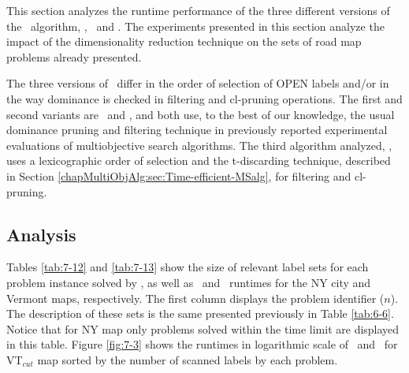 This section analyzes the runtime performance of the three different versions of the \namoa \ algorithm, \namoalex, \namoalin \ and \namoate. The experiments presented in this section analyze the impact of the dimensionality reduction technique on the sets of road map problems already presented.

The three versions of \namoa \ differ in the order of selection of OPEN labels and/or in the way dominance is checked in filtering and cl-pruning operations. The first and second variants are \namoalex \ and \namoalin, and both use, to the best of our knowledge, the usual dominance pruning and filtering technique in previously reported experimental evaluations of multiobjective search algorithms. The third algorithm analyzed, \namoate, uses a lexicographic order of selection and the t-discarding technique, described in Section \ref{chapMultiObjAlg:sec:Time-efficient-MSalg}, for filtering and cl-pruning.

\subsection{Analysis}
\label{chapEmpiricalAnalysis:subsec:analysisdimacsnamoate}

Tables \ref{tab:7-12} and \ref{tab:7-13} show the size of relevant label sets for each problem instance solved by \namoate, as well as \namoalin \ and \namoate \ runtimes for the NY city and Vermont maps, respectively. The first column displays the problem identifier ($n$). The description of these sets is the same presented previously in Table \ref{tab:6-6}. Notice that for NY map only problems solved within the time limit are displayed in this table. Figure \ref{fig:7-3} shows the runtimes in logarithmic scale of \namoalin \ and \namoate \ for VT$_{cut}$ map sorted by the number of scanned labels by each problem.

